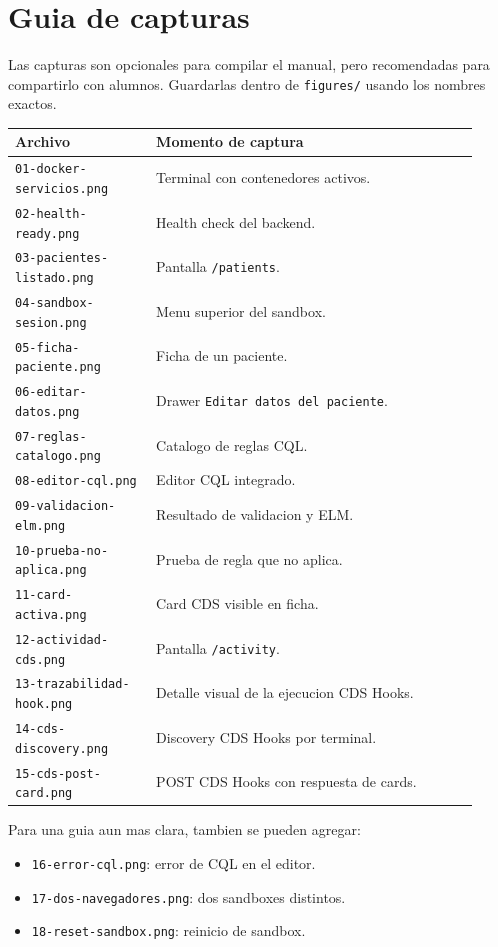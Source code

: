 \section{Guia de capturas}

Las capturas son opcionales para compilar el manual, pero recomendadas para
compartirlo con alumnos. Guardarlas dentro de \texttt{figures/} usando los
nombres exactos.

\begin{longtable}{p{0.28\linewidth}p{0.64\linewidth}}
\toprule
Archivo & Momento de captura \\
\midrule
\texttt{01-docker-servicios.png} & Terminal con contenedores activos. \\
\texttt{02-health-ready.png} & Health check del backend. \\
\texttt{03-pacientes-listado.png} & Pantalla \texttt{/patients}. \\
\texttt{04-sandbox-sesion.png} & Menu superior del sandbox. \\
\texttt{05-ficha-paciente.png} & Ficha de un paciente. \\
\texttt{06-editar-datos.png} & Drawer \texttt{Editar datos del paciente}. \\
\texttt{07-reglas-catalogo.png} & Catalogo de reglas CQL. \\
\texttt{08-editor-cql.png} & Editor CQL integrado. \\
\texttt{09-validacion-elm.png} & Resultado de validacion y ELM. \\
\texttt{10-prueba-no-aplica.png} & Prueba de regla que no aplica. \\
\texttt{11-card-activa.png} & Card CDS visible en ficha. \\
\texttt{12-actividad-cds.png} & Pantalla \texttt{/activity}. \\
\texttt{13-trazabilidad-hook.png} & Detalle visual de la ejecucion CDS Hooks. \\
\texttt{14-cds-discovery.png} & Discovery CDS Hooks por terminal. \\
\texttt{15-cds-post-card.png} & POST CDS Hooks con respuesta de cards. \\
\bottomrule
\end{longtable}

Para una guia aun mas clara, tambien se pueden agregar:

\begin{itemize}
  \item \texttt{16-error-cql.png}: error de CQL en el editor.
  \item \texttt{17-dos-navegadores.png}: dos sandboxes distintos.
  \item \texttt{18-reset-sandbox.png}: reinicio de sandbox.
\end{itemize}
